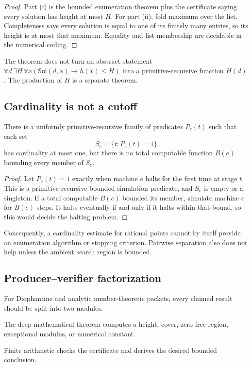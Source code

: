 \begin{proof}
Part (i) is the bounded enumeration theorem plus the certificate saying every
solution has height at most \(H\).  For part (ii), fold maximum over the list.
Completeness says every solution is equal to one of its finitely many
entries, so its height is at most that maximum.  Equality and list membership
are decidable in the numerical coding.
\end{proof}

The theorem does not turn an abstract statement
\(\forall d\,\exists H\,\forall x(\mathsf{Sol}(d,x)\to h(x)\le H)\)
into a primitive-recursive function \(H(d)\).  The production of \(H\) is a
separate theorem.

\subsection{Cardinality is not a cutoff}

\begin{theorem}
There is a uniformly primitive-recursive family of predicates \(P_e(t)\)
such that each set
\[
        S_e=\{t:P_e(t)=1\}
\]
has cardinality at most one, but there is no total computable function
\(B(e)\) bounding every member of \(S_e\).
\end{theorem}

\begin{proof}
Let \(P_e(t)=1\) exactly when machine \(e\) halts for the first time at stage
\(t\).  This is a primitive-recursive bounded simulation predicate, and
\(S_e\) is empty or a singleton.  If a total computable \(B(e)\) bounded its
member, simulate machine \(e\) for \(B(e)\) steps.  It halts eventually if and
only if it halts within that bound, so this would decide the halting problem.
\end{proof}

Consequently, a cardinality estimate for rational points cannot by itself
provide an enumeration algorithm or stopping criterion.  Pairwise separation
also does not help unless the ambient search region is bounded.

\subsection{Producer--verifier factorization}

For Diophantine and analytic number-theoretic packets, every claimed result
should be split into two modules.

\begin{description}[leftmargin=3.2em,style=nextline]
\item[Certificate producer.]
The deep mathematical theorem computes a height, cover, zero-free region,
exceptional modulus, or numerical constant.
\item[Certificate verifier.]
Finite arithmetic checks the certificate and derives the desired bounded
conclusion.
\end{description}

